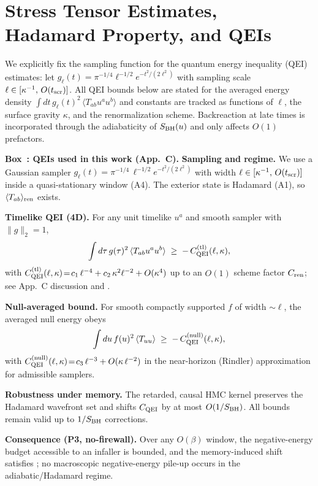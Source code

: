 \documentclass[11pt,a4paper]{article}
\newcommand{\HMC}{\textsc{HMC}\xspace}
\newcounter{boxedresult}
\newenvironment{boxedresult}[1]{\refstepcounter{boxedresult}\begin{infobox}\noindent\textbf{Box~\theboxedresult: #1.}}{\end{infobox}}
\theoremstyle{plain}
\theoremstyle{definition}
\theoremstyle{remark}
\begin{document}
\section{Stress Tensor Estimates, Hadamard Property, and QEIs}
\label{app:stress_tensor}
\label{app:qei-derivation}
We explicitly fix the sampling function for the quantum energy inequality (QEI) estimates:
let \(g_\ell(t)=\pi^{-1/4}\ell^{-1/2}e^{-t^2/(2\ell^2)}\) with sampling scale \(\ell\in[\kappa^{-1},\,O(t_{\rm scr})]\).
All QEI bounds below are stated for the averaged energy density \(\int dt\,g_\ell(t)^2\,\langle T_{ab}u^a u^b\rangle\)
and constants are tracked as functions of \(\ell\), the surface gravity \(\kappa\), and the renormalization scheme.
Backreaction at late times is incorporated through the adiabaticity of \(S_{\rm BH}(u)\) and only affects \(O(1)\) prefactors.

\begin{boxedresult}{QEIs used in this work (App.~C)}\label{box:qei-appC}
\small
\textbf{Sampling and regime.} We use a Gaussian sampler $g_\ell(t)=\pi^{-1/4}\,\ell^{-1/2}e^{-t^2/(2\ell^2)}$ with width $\ell\in[\kappa^{-1},\,O(t_{\rm scr})]$ inside a quasi-stationary window (A4). The exterior state is Hadamard (A1), so $\langle T_{ab}\rangle_{\rm ren}$ exists.

\textbf{Timelike QEI (4D).} For any unit timelike $u^a$ and smooth sampler with $\|g\|_2=1$,
\[
\int d\tau\, g(\tau)^2\,\langle T_{ab}u^au^b\rangle \;\ge\; -\,C_{\rm QEI}^{\rm(tl)}(\ell,\kappa),
\]
with $C_{\rm QEI}^{\rm(tl)}(\ell,\kappa)\!=\!c_1\,\ell^{-4}+c_2\,\kappa^2\ell^{-2}+O(\kappa^4)$ up to an $O(1)$ scheme factor $C_{\rm ren}$; see App.~C discussion and \cite{Fewster:2012}.

\textbf{Null-averaged bound.} For smooth compactly supported $f$ of width $\sim\ell$, the averaged null energy obeys
\[
\int du\, f(u)^2\,\langle T_{uu}\rangle \;\ge\; -\,C_{\rm QEI}^{\rm(null)}(\ell,\kappa),
\]
with $C_{\rm QEI}^{\rm(null)}(\ell,\kappa)\!=\!c_3\,\ell^{-3}+O(\kappa\,\ell^{-2})$ in the near-horizon (Rindler) approximation for admissible samplers.

\textbf{Robustness under memory.} The retarded, causal \HMC{} kernel preserves the Hadamard wavefront set and shifts $C_{\rm QEI}$ by at most $O(1/S_{\rm BH})$. All bounds remain valid up to $1/S_{\rm BH}$ corrections.

\textbf{Consequence (P3, no-firewall).} Over any $O(\beta)$ window, the negative-energy budget accessible to an infaller is bounded, and the memory-induced shift satisfies ; no macroscopic negative-energy pile-up occurs in the adiabatic/Hadamard regime.
\end{boxedresult}
\end{document}
